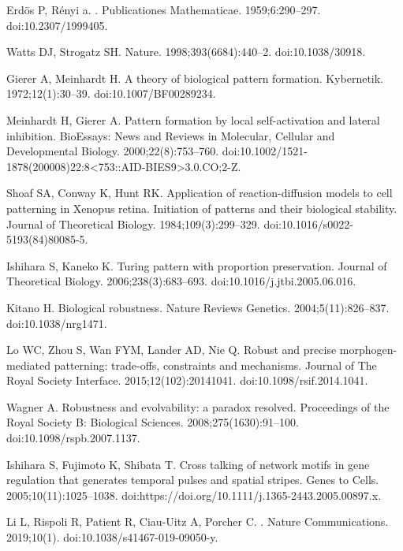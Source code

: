 \documentclass[10pt,letterpaper]{article}
\begin{document}
\begin{thebibliography}{10}
Erd{\"{o}}s P, R{\'{e}}nyi a.
.
\newblock Publicationes Mathematicae. 1959;6:290--297.
\newblock doi:{10.2307/1999405}.

Watts DJ, Strogatz SH.
\newblock Nature. 1998;393(6684):440--2.
\newblock doi:{10.1038/30918}.

Gierer A, Meinhardt H.
\newblock A theory of biological pattern formation.
\newblock Kybernetik. 1972;12(1):30--39.
\newblock doi:{10.1007/BF00289234}.

Meinhardt H, Gierer A.
\newblock Pattern formation by local self-activation and lateral inhibition.
\newblock BioEssays: News and Reviews in Molecular, Cellular and Developmental
  Biology. 2000;22(8):753--760.
\newblock doi:{10.1002/1521-1878(200008)22:8<753::AID-BIES9>3.0.CO;2-Z}.

Shoaf SA, Conway K, Hunt RK.
\newblock Application of reaction-diffusion models to cell patterning in
  {Xenopus} retina. {Initiation} of patterns and their biological stability.
\newblock Journal of Theoretical Biology. 1984;109(3):299--329.
\newblock doi:{10.1016/s0022-5193(84)80085-5}.

Ishihara S, Kaneko K.
\newblock Turing pattern with proportion preservation.
\newblock Journal of Theoretical Biology. 2006;238(3):683--693.
\newblock doi:{10.1016/j.jtbi.2005.06.016}.

Kitano H.
\newblock Biological robustness.
\newblock Nature Reviews Genetics. 2004;5(11):826--837.
\newblock doi:{10.1038/nrg1471}.

Lo WC, Zhou S, Wan FYM, Lander AD, Nie Q.
\newblock Robust and precise morphogen-mediated patterning: trade-offs,
  constraints and mechanisms.
\newblock Journal of The Royal Society Interface. 2015;12(102):20141041.
\newblock doi:{10.1098/rsif.2014.1041}.

Wagner A.
\newblock Robustness and evolvability: a paradox resolved.
\newblock Proceedings of the Royal Society B: Biological Sciences.
  2008;275(1630):91--100.
\newblock doi:{10.1098/rspb.2007.1137}.

Ishihara S, Fujimoto K, Shibata T.
\newblock Cross talking of network motifs in gene regulation that generates
  temporal pulses and spatial stripes.
\newblock Genes to Cells. 2005;10(11):1025--1038.
\newblock doi:{https://doi.org/10.1111/j.1365-2443.2005.00897.x}.

Li L, Rispoli R, Patient R, Ciau-Uitz A, Porcher C.
.
\newblock Nature Communications. 2019;10(1).
\newblock doi:{10.1038/s41467-019-09050-y}.

\end{thebibliography}
\end{document}
